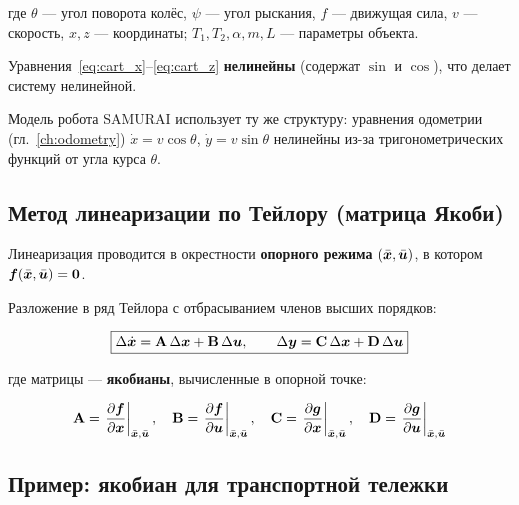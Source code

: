где $\theta$ --- угол поворота колёс, $\psi$ --- угол рыскания,
$f$ --- движущая сила, $v$ --- скорость, $x,z$ --- координаты;
$T_1, T_2, \alpha, m, L$ --- параметры объекта.

Уравнения~\eqref{eq:cart_x}--\eqref{eq:cart_z} \textbf{нелинейны}
(содержат $\sin$ и $\cos$), что делает систему нелинейной.

\begin{notebox}
Модель робота SAMURAI использует ту же структуру:
уравнения одометрии (гл.~\ref{ch:odometry}) $\dot{x} = v\cos\theta$,
$\dot{y} = v\sin\theta$ нелинейны из-за тригонометрических функций
от угла курса $\theta$.
\end{notebox}

\subsection{Метод линеаризации по Тейлору (матрица Якоби)}
\label{sec:jacobian}

Линеаризация проводится в окрестности \textbf{опорного режима}
$(\bar{\bm{x}}, \bar{\bm{u}})$, в котором $\bm{f}(\bar{\bm{x}}, \bar{\bm{u}}) = \bm{0}$.

Разложение в ряд Тейлора с отбрасыванием членов высших порядков:

\begin{equation}
  \boxed{
  \Delta\dot{\bm{x}} = \mathbf{A}\,\Delta\bm{x} + \mathbf{B}\,\Delta\bm{u}, \qquad
  \Delta\bm{y} = \mathbf{C}\,\Delta\bm{x} + \mathbf{D}\,\Delta\bm{u}
  }
  \label{eq:linearized}
\end{equation}

где матрицы --- \textbf{якобианы}, вычисленные в опорной точке:

\begin{equation}
  \mathbf{A} = \left.\frac{\partial \bm{f}}{\partial \bm{x}}\right|_{\bar{\bm{x}},\bar{\bm{u}}}, \quad
  \mathbf{B} = \left.\frac{\partial \bm{f}}{\partial \bm{u}}\right|_{\bar{\bm{x}},\bar{\bm{u}}}, \quad
  \mathbf{C} = \left.\frac{\partial \bm{g}}{\partial \bm{x}}\right|_{\bar{\bm{x}},\bar{\bm{u}}}, \quad
  \mathbf{D} = \left.\frac{\partial \bm{g}}{\partial \bm{u}}\right|_{\bar{\bm{x}},\bar{\bm{u}}}
  \label{eq:jacobians}
\end{equation}

\subsection{Пример: якобиан для транспортной тележки}

